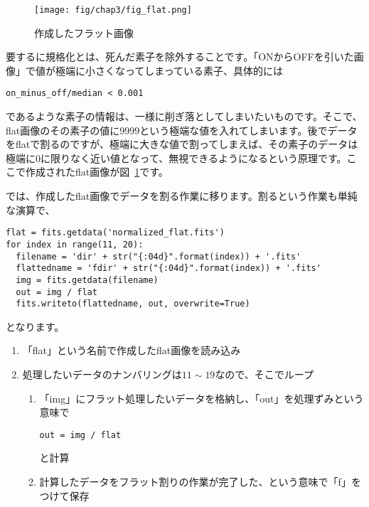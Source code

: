 \begin{figure}
  \centering
	\texttt{[image: fig/chap3/fig\_flat.png]}
	\caption[作成したフラット画像]{作成したフラット画像\label{fig_3_f}}
\end{figure}

要するに規格化とは、死んだ素子を除外することです。「ONからOFFを引いた画像」で値が極端に小さくなってしまっている素子、具体的には
\begin{verbatim}on_minus_off/median < 0.001\end{verbatim}
であるような素子の情報は、一様に削ぎ落としてしまいたいものです。そこで、flat画像のその素子の値に$9999$という極端な値を入れてしまいます。後でデータをflatで割るのですが、極端に大きな値で割ってしまえば、その素子のデータは極端に0に限りなく近い値となって、無視できるようになるという原理です。ここで作成されたflat画像が図~\ref{fig_3_f}です。

では、作成したflat画像でデータを割る作業に移ります。割るという作業も単純な演算で、
\begin{lstlisting}[caption=フラット割り,label=code_3_4_5]
flat = fits.getdata('normalized_flat.fits')
for index in range(11, 20):
  filename = 'dir' + str("{:04d}".format(index)) + '.fits'
  flattedname = 'fdir' + str("{:04d}".format(index)) + '.fits'
  img = fits.getdata(filename)
  out = img / flat
  fits.writeto(flattedname, out, overwrite=True)
\end{lstlisting}
となります。

\begin{enumerate}
  \item 「flat」という名前で作成したflat画像を読み込み
  \item 処理したいデータのナンバリングは$11\sim19$なので、そこでループ
  \begin{enumerate}
    \item 「img」にフラット処理したいデータを格納し、「out」を処理ずみという意味で\begin{verbatim}out = img / flat\end{verbatim}と計算
    \item 計算したデータをフラット割りの作業が完了した、という意味で「f」をつけて保存
  \end{enumerate}
\end{enumerate}

